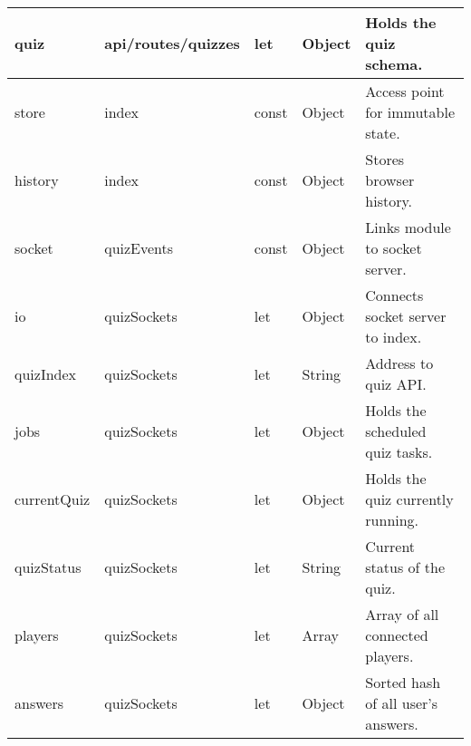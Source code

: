 \begin{longtable}{|l|l|l|l|l|}
quiz                                & api/routes/quizzes                   & let                                & Object                               & Holds the quiz schema.                \\ \hline
store                               & index                                & const                              & Object                               & Access point for immutable state.     \\ \hline
history                             & index                                & const                              & Object                               & Stores browser history.               \\ \hline
socket                              & quizEvents                           & const                              & Object                               & Links module to socket server.        \\ \hline
io                                  & quizSockets                          & let                                & Object                               & Connects socket server to index.      \\ \hline
quizIndex                           & quizSockets                          & let                                & String                               & Address to quiz API.                  \\ \hline
jobs                                & quizSockets                          & let                                & Object                               & Holds the scheduled quiz tasks.       \\ \hline
currentQuiz                         & quizSockets                          & let                                & Object                               & Holds the quiz currently running.     \\ \hline
quizStatus                          & quizSockets                          & let                                & String                               & Current status of the quiz.           \\ \hline
players                             & quizSockets                          & let                                & Array                                & Array of all connected players.       \\ \hline
answers                             & quizSockets                          & let                                & Object                               & Sorted hash of all user's answers.    \\ \hline

\end{longtable}
